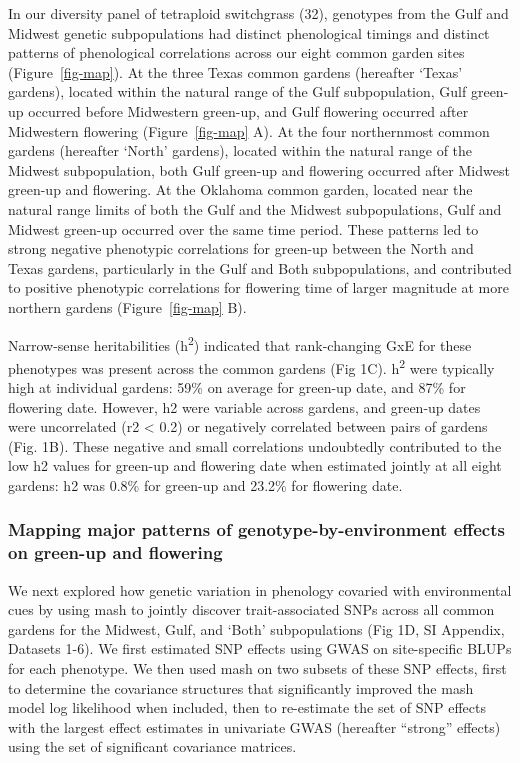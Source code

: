 \documentclass[
  9pt,
  twocolumn,
  twoside]{pnas-new}
\begin{document}
In our diversity panel of tetraploid switchgrass (32), genotypes from
the Gulf and Midwest genetic subpopulations had distinct phenological
timings and distinct patterns of phenological correlations across our
eight common garden sites (Figure~\ref{fig-map}). At the three Texas
common gardens (hereafter `Texas' gardens), located within the natural
range of the Gulf subpopulation, Gulf green-up occurred before
Midwestern green-up, and Gulf flowering occurred after Midwestern
flowering (Figure~\ref{fig-map} A). At the four northernmost common
gardens (hereafter `North' gardens), located within the natural range of
the Midwest subpopulation, both Gulf green-up and flowering occurred
after Midwest green-up and flowering. At the Oklahoma common garden,
located near the natural range limits of both the Gulf and the Midwest
subpopulations, Gulf and Midwest green-up occurred over the same time
period. These patterns led to strong negative phenotypic correlations
for green-up between the North and Texas gardens, particularly in the
Gulf and Both subpopulations, and contributed to positive phenotypic
correlations for flowering time of larger magnitude at more northern
gardens (Figure~\ref{fig-map} B).

Narrow-sense heritabilities (h\textsuperscript{2}) indicated that
rank-changing GxE for these phenotypes was present across the common
gardens (Fig 1C). h\textsuperscript{2} were typically high at individual
gardens: 59\% on average for green-up date, and 87\% for flowering date.
However, h2 were variable across gardens, and green-up dates were
uncorrelated (r2 \textless{} 0.2) or negatively correlated between pairs
of gardens (Fig. 1B). These negative and small correlations undoubtedly
contributed to the low h2 values for green-up and flowering date when
estimated jointly at all eight gardens: h2 was 0.8\% for green-up and
23.2\% for flowering date.

\subsubsection{Mapping major patterns of genotype-by-environment effects
on green-up and
flowering}\label{mapping-major-patterns-of-genotype-by-environment-effects-on-green-up-and-flowering}

We next explored how genetic variation in phenology covaried with
environmental cues by using mash to jointly discover trait-associated
SNPs across all common gardens for the Midwest, Gulf, and `Both'
subpopulations (Fig 1D, SI Appendix, Datasets 1-6). We first estimated
SNP effects using GWAS on site-specific BLUPs for each phenotype. We
then used mash on two subsets of these SNP effects, first to determine
the covariance structures that significantly improved the mash model log
likelihood when included, then to re-estimate the set of SNP effects
with the largest effect estimates in univariate GWAS (hereafter
``strong'' effects) using the set of significant covariance matrices.
\end{document}
